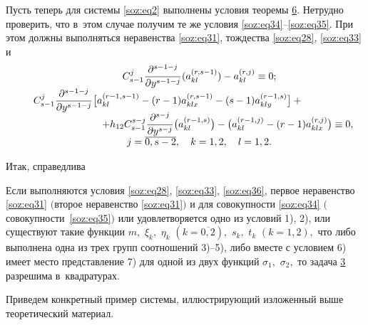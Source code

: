 \medskip

Пусть теперь для системы \eqref{soz:eq2}  выполнены условия теоремы \hyperlink{soz:th6}{6}. 
Нетрудно проверить, что в~этом случае получим те же условия \eqref{soz:eq34}--\eqref{soz:eq35}. 
При этом должны выполняться  неравенства  \eqref{soz:eq31}, тождества \eqref{soz:eq28}, \eqref{soz:eq33}  и
 \begin{equation}
 \label{soz:eq36}
\begin{array}{c}
C_{s-1}^{j}\dfrac{\partial^{s-1-j}}{\partial y^{s-1-j}}(a_{kl}^{(r,s-1)})-a_{kl}^{(r,j)}\equiv0;
\\[2mm]
C_{s-1}^{j}\dfrac{\partial^{s-1-j}}{\partial y^{s-1-j}}
\bigl[a_{kl}^{(r-1,s-1)}-(r-1)a_{klx}^{(r,s-1)}-(s-1)a_{kly}^{(r-1,s)}\bigr]+ \hspace{2cm} \phantom{1}
\\
\hspace{2cm} 
+h_{12}C_{s-1}^{s-j}\dfrac{\partial^{s-j}}{\partial y^{s-j}}
\bigl(a_{kl}^{(r-1,s)}\bigr)-\bigl(a_{kl}^{(r-1,j)}-(r-1)a_{klx}^{(r,j)}\bigr)\equiv0,
\\[2mm]
j=\overline{0,s-2},\quad k=1, 2,\quad  l=1, 2.
\end{array} \hspace{-1cm}
\end{equation}

Итак, справедлива

\medskip
\hypertarget{soz:th8}{}
\begin{theorem}[8]Если выполняются условия {\rm \eqref{soz:eq28}, \eqref{soz:eq33}, \eqref{soz:eq36}, } первое неравенство  \eqref{soz:eq31} $($второе неравенство \eqref{soz:eq31}$)$ 
и для совокупности \eqref{soz:eq34} $($совокуп\-ности~\eqref{soz:eq35}$)$ или удовлетворяется  одно из условий {\rm 1), 2),} или существуют такие функции $m,$ $\xi_{k},$ $\eta_{k}$ $(k=\overline{0, 2}),$ $s_{k},$ $t_{k}$ $ (k=1, 2),$
что либо выполнена одна из трех групп соотношений {\rm 3)--5),}
либо вместе с условием {\rm 6)} имеет место представление {\rm 7)}
для одной из двух функций $\sigma_{1},$ $\sigma_{2},$ то задача \hyperlink{soz:task3}{\rm 3} разрешима в~квадратурах.
\end{theorem}
\medskip


\smallskip

 Приведем конкретный пример системы, иллюстрирующий изложенный выше теоретический материал.

